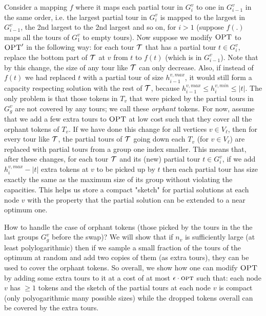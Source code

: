 \documentclass[twoside,leqno]{article}
\newcommand{\calT}{{\cal T}}
\newcommand{\opt}{\mbox{\sc opt}}
\newcommand{\OPT}{\mbox{\sc OPT}}
\newcommand{\eps}{\epsilon}
\begin{document}
Consider a mapping $f$ where it maps each partial tour in $G^v_i$ to one in $G^v_{i-1}$ in the same order, i.e. the largest partial tour in $G^v_{i}$ is mapped to the largest in $G^v_{i-1}$, the 2nd largest to the 2nd largest and so on, for $i>1$ (suppose $f(.)$ maps all the tours of $G^v_1$ to empty tours). 
Now suppose we modify $\OPT$ to  $\OPT'$ in the following way: for each tour $\calT$ that has a partial
tour $t\in G^v_i$, replace the bottom part of $\calT$ at $v$ from $t$ to $f(t)$ (which is in $G^v_{i-1}$).
Note that by this change, the size of any tour like $\calT$ can only decrease.
Also, if instead of $f(t)$ we had replaced $t$ with a partial
tour of size $h^{v,max}_{i-1}$, it would still form a capacity respecting solution with the rest of $\calT$, 
because $h^{v,max}_{i-1}\leq h^{v,min}_i\leq |t|$. The only problem is that those tokens in $T_v$ that were picked
by the partial tours in $G^v_g$ are not covered by any tours; we call these {\em orphant} tokens. 
For now, assume that we add a few extra tours to $\OPT$ at low cost such that they cover all the orphant tokens of $T_v$.
If we have done this change for all vertices $v\in V_\ell$, then for every  tour like $\calT$,
the partial tours of $\calT$ going down each $T_v$ (for $v\in V_\ell$) are replaced with partial tours from a group 
one index smaller.
This means that, after these changes, 
for each tour $\calT$ and its (new) partial tour $t\in G^v_i$, if we add $h^{v,max}_i-|t|$ extra tokens at $v$ to be picked up by $t$ then each partial tour has size exactly the same as the maximum size of its group without violating the capacities.
This helps us store a compact "sketch" 
for partial solutions
at each node $v$ with the property that the partial solution can be extended to a near optimum one.

How to handle the case of orphant tokens (those picked by the tours in the the last groups $G^v_g$ before the swap)? 
We will show that if $n_v$ is sufficiently large (at least polylogarithmic) then if we sample a small fraction of the tours of the optimum at random and add two copies of them (as extra tours), they
can be used to cover the orphant tokens. So overall, we show how one can modify $\OPT$ by adding some extra tours to it
at a cost of at most $\eps\cdot\opt$ such that: each node $v$ has $\geq 1$ tokens and 
the sketch of the partial tours at each node $v$ is compact (only polyogarithmic many possible sizes) while the dropped tokens overall can be covered by the extra tours.

\end{document}
